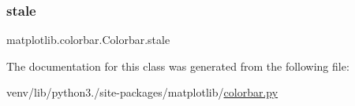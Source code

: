 \subsubsection{\texorpdfstring{stale}{stale}}
{\footnotesize\ttfamily matplotlib.\+colorbar.\+Colorbar.\+stale}



The documentation for this class was generated from the following file\+:\begin{DoxyCompactItemize}
\item 
venv/lib/python3./site-\/packages/matplotlib/\hyperlink{colorbar_8py}{colorbar.\+py}\end{DoxyCompactItemize}
